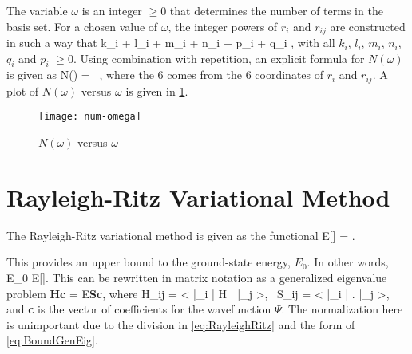\documentclass[Dissertation.tex]{subfiles}
\begin{document}
The variable $\omega$ is an integer $\geq 0$ that determines the number of 
terms in the basis set. For a chosen value of $\omega$, the integer powers of 
$r_i$ and $r_{ij}$ are constructed in such a way that \cite{VanReeth2003}
\beq
\label{eq:OmegaDef}
k_i + l_i + m_i + n_i + p_i + q_i \leq \omega,
\eeq
with all $k_i$, $l_i$, $m_i$, $n_i$, $q_i$ and $p_i$ $\geq 0$. 
Using combination with repetition, an explicit formula for $N(\omega)$ is 
given as
\beq
\label{eq:NumberTermsOmega}
N(\omega) =  \, ,
\eeq
where the 6 comes from the 6 coordinates of $r_i$ and $r_{ij}$. A plot of
$N(\omega)$ versus $\omega$ is given in \cref{fig:num-omega}.
\begin{figure}
	\centering
	\texttt{[image: num-omega]}
	\caption{$N(\omega)$ versus $\omega$}
	\label{fig:num-omega}
\end{figure}


\section{Rayleigh-Ritz Variational Method}
\label{sec:RayleighRitz}
The Rayleigh-Ritz variational method is given as the functional \cite{Bransden2003}
\beq
\label{eq:RayleighRitz}
E[\Psi] = .
\eeq

\noindent This provides an upper bound to the ground-state energy, $E_0$. In other words,
\beq
E_0 \leq E[\Psi].
\eeq
This can be rewritten in matrix notation as a generalized eigenvalue problem
\cite{RayleighRitz}
\beq
\label{eq:BoundGenEig}
\textbf{Hc} = E\textbf{Sc},
\eeq
where
\beq
\label{eq:HijSij}
H_{ij} = \left< \bar{\phi}_i \left| H \right| \bar{\phi}_j \right>\!, \, S_{ij} = \left< \bar{\phi}_i \left| \right.\! \bar{\phi}_j \right>, 
\eeq
and \textbf{c} is the vector of coefficients for the wavefunction $\Psi$. The
normalization here is unimportant due to the division in \cref{eq:RayleighRitz}
and the form of \cref{eq:BoundGenEig}.
\end{document}
